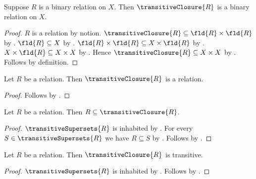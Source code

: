 \begin{classification}\label{transitive_closure_binary_relation_on}
    Suppose $R$ is a binary relation on $X$.
    Then $\transitiveClosure{R}$ is a binary relation on $X$.
\end{classification}
\begin{proof}
    $R$ is a relation by notion.
    $\transitiveClosure{R}\subseteq\fld{R}\times\fld{R}$
        by .
    $\fld{R}\subseteq X$ by .
    $\fld{R}\times\fld{R}\subseteq X\times\fld{R}$
        by .
    $X\times\fld{R}\subseteq X\times X$
        by .
    Hence $\transitiveClosure{R}\subseteq X\times X$
        by .
    Follows by definition.
\end{proof}

\begin{proposition}\label{transitive_closure_is_relation}
    Let $R$ be a relation.
    Then $\transitiveClosure{R}$ is a relation.
\end{proposition}
\begin{proof}
    Follows by .
\end{proof}

\begin{proposition}\label{transitive_closure_contains}
    Let $R$ be a relation.
    Then $R\subseteq\transitiveClosure{R}$.
\end{proposition}
\begin{proof}
    $\transitiveSupersets{R}$ is inhabited by .
    For every $S\in\transitiveSupersets{R}$ we have $R\subseteq S$
        by .
    Follows by .
\end{proof}

\begin{proposition}\label{transitive_closure_is_transitive}
    Let $R$ be a relation.
    Then $\transitiveClosure{R}$ is transitive.
\end{proposition}
\begin{proof}
    $\transitiveSupersets{R}$ is inhabited by .
    Follows by .
\end{proof}

